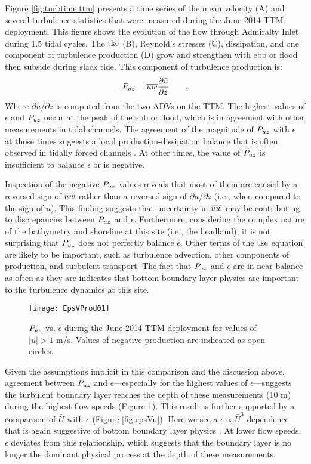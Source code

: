 Figure \ref{fig:turbtime:ttm} presents a time series of the mean velocity (A) and several turbulence statistics that were measured during the June 2014 TTM deployment. This figure shows the evolution of the flow through Admiralty Inlet during 1.5 tidal cycles. The $\mathrm{tke}$ (B), Reynold's stresses (C), dissipation, and one component of turbulence production (D) grow and strengthen with ebb or flood then subside during slack tide.  This component of turbulence production is:
\begin{align}
  P_{uz} = \overline{uw}\frac{\partial \bar{u}}{\partial z} \qquad.
\end{align}
Where $\partial \bar{u}/\partial z$ is computed from the two ADVs on the TTM. The highest values of $\epsilon$ and $P_{uz}$ occur at the peak of the ebb or flood, which is in agreement with other measurements in tidal channels. The agreement of the magnitude of $P_{uz}$ with $\epsilon$ at those times suggests a local production-dissipation balance that is often observed in tidally forced channels \cite[]{Trowbridge++1999,Stacey++1999,McMillan++2016}. At other times, the value of $P_{uz}$ is insufficient to balance $\epsilon$ or is negative. 

Inspection of the negative $P_{uz}$ values reveals that most of them are caused by a reversed sign of $\overline{uw}$ rather than a reversed sign of $\partial u / \partial z$ (i.e., when compared to the sign of $u$). This finding suggests that uncertainty in $\overline{uw}$ may be contributing to discrepancies between $P_{uz}$ and $\epsilon$. Furthermore, considering the complex nature of the bathymetry and shoreline at this site (i.e., the headland), it is not surprising that $P_{uz}$ does not perfectly balance $\epsilon$. Other terms of the $\mathrm{tke}$ equation are likely to be important, such as turbulence advection, other components of production, and turbulent transport. The fact that $P_{uz}$ and $\epsilon$ are in near balance as often as they are indicates that bottom boundary layer physics are important to the turbulence dynamics at this site.

\begin{figure}[t]
  \centering
  \texttt{[image: EpsVProd01]}
  \caption{$P_{uz}$ vs. $\epsilon$ during the June 2014 TTM deployment for values of $|u|>1$ m/s. Values of negative production are indicated as open circles. }
  \label{fig:prodVeps}
\end{figure}

Given the assumptions implicit in this comparison and the discussion above, agreement between $P_{uz}$ and $\epsilon$---especially for the highest values of $\epsilon$---suggests the turbulent boundary layer reaches the depth of these measurements (10 m) during the highest flow speeds (Figure \ref{fig:prodVeps}). This result is further supported by a comparison of $\bar{U}$ with $\epsilon$ (Figure \ref{fig:epsVu}). Here we see a $\epsilon \propto \bar{U}^3$ dependence that is again suggestive of bottom boundary layer physics \cite[]{Trowbridge1992,Nash++2009}. At lower flow speeds, $\epsilon$ deviates from this relationship, which suggests that the boundary layer is no longer the dominant physical process at the depth of these measurements.

